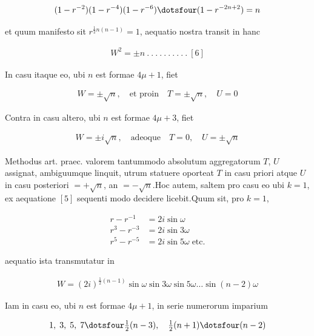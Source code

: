 \[
\begin{aligned}
(1-r^{-2})(1-r^{-4})(1-r^{-6})\dotsfour(1-r^{-2n+2})=n
\end{aligned}
\]

et quum manifesto sit $r^{\frac12n(n-1)}=1$, aequatio nostra transit in hanc

\[
\begin{aligned}
W^2=\pm n\  .\  .\  .\  .\  .\  .\  .\  .\  .\  .\ [6]
\end{aligned}
\]

In casu itaque eo, ubi $n$ est formae $4\mu+1$, fiet

\[
\begin{aligned}
W=\pm\surd n,\quad\text{et proin}\quad T=\pm\surd n,\quad U=0
\end{aligned}
\]

Contra in casu altero, ubi $n$ est formae $4\mu+3$, fiet

\[
\begin{aligned}
W=\pm i\surd n,\quad\text{adeoque}\quad T=0,\quad U=\pm\surd n
\end{aligned}
\]


Methodus art. praec. valorem tantummodo absolutum aggregatorum $T$, $U$ assignat, ambiguumque linquit, utrum statuere oporteat $T$ in casu priori atque $U$ in casu posteriori $=+\surd n$, an $=-\surd n$.\quad Hoc autem, saltem pro casu eo ubi $k=1$, ex aequatione $[5]$ sequenti modo decidere licebit.\quad Quum sit, pro $k=1$,


\[
\begin{aligned}
r-r^{-1}&=2i\sin\omega\\
r^3-r^{-3}&=2i\sin3\omega\\
r^5-r^{-5}&=2i\sin5\omega\;\text{etc.}
\end{aligned}
\]

aequatio ista transmutatur in

\[
\begin{aligned}
W=(2i)^{\frac12(n-1)}\sin\omega\sin3\omega\sin5\omega\ldots\sin(n-2)\omega
\end{aligned}
\]

Iam in casu eo, ubi $n$ est formae $4\mu+1$, in serie numerorum imparium

\[
\begin{aligned}
1,\;3,\;5,\;7\dotsfour\tfrac12(n-3),\quad\tfrac12(n+1)\dotsfour(n-2)
\end{aligned}
\]

